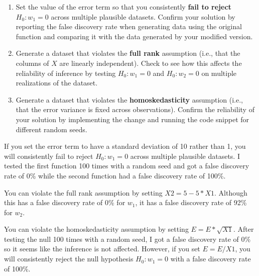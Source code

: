 \documentclass{article}
\begin{document}
\begin{probset}
\begin{prob} 
\begin{subprobset}
\begin{subprob}
            \begin{enumerate}[label=\roman*.]
                \item Set the value of the error term so that you consistently \textbf{fail to reject} $H_0 : w_1 = 0$ across
                multiple plausible datasets. Confirm your solution by reporting the false discovery rate
                when generating data using the original function and comparing it with the data generated
                by your modified version.
                \item Generate a dataset that violates the \textbf{full rank} assumption (i.e., that the columns of $X$ are
                linearly independent). Check to see how this affects the reliability of inference by testing
                $H_0 : w_1 = 0$ and $H_0 : w_2 = 0$ on multiple realizations of the dataset.
                \item Generate a dataset that violates the \textbf{homoskedasticity} assumption (i.e., that the error
                variance is fixed across observations). Confirm the reliability of your solution by implementing the change and running the code snippet for different random seeds.
            \end{enumerate}

            \begin{soln}
                If you set the error term to have a standard deviation of 10 rather than 1, you will consistently fail to reject $H_0 : w_1 = 0$ across multiple plausible datasets. I tested the first function 100 times with a random seed and got a false discovery rate of 0\% while the second function had a false discovery rate of 100\%.

                You can violate the full rank assumption by setting $X2 = 5 - 5 * X1$. Although this has a false discovery rate of 0\% for $w_1$, it has a false discovery rate of 92\% for $w_2$.

                You can violate the homoskedasticity assumption by setting $E = E * \sqrt{X1}$. After testing the null 100 times with a random seed, I got a false discovery rate of 0\% so it seems like the inference is not affected. However, if you set $E = E / X1$, you will consistently reject the null hypothesis $H_0 : w_1 = 0$ with a false discovery rate of 100\%.
            \end{soln}
        \end{subprob}
    \end{subprobset}
\end{prob}


\end{probset}
\end{document}
